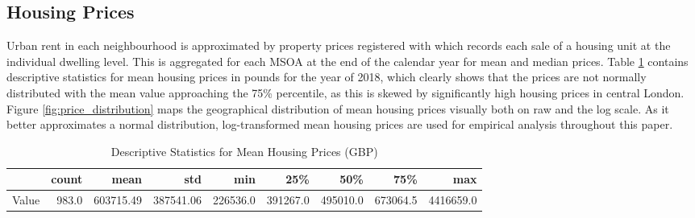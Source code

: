 \documentclass{article}
\begin{document}
\subsection{Housing Prices}
Urban rent in each neighbourhood is approximated by property prices registered with \citet{LandRegistry2019AverageLSOA} which records each sale of a housing unit at the individual dwelling level. This is aggregated for each MSOA at the end of the calendar year for mean and median prices. Table \ref{table:housing} contains descriptive statistics for mean housing prices in pounds for the year of 2018, which clearly shows that the prices are not normally distributed with the mean value approaching the 75\% percentile, as this is skewed by significantly high housing prices in central London. Figure \ref{fig:price_distribution} maps the geographical distribution of mean housing prices visually both on raw and the log scale. As it better approximates a normal distribution, log-transformed mean housing prices are used for empirical analysis throughout this paper.

\begin{table}[t]
\caption{Descriptive Statistics for Mean Housing Prices (GBP)} 
  \label{table:housing} 
\begin{tabular}{lrrrrrrrr}
\toprule
{} &  count &       mean &        std &       min &       25\% &       50\% &       75\% &        max \\
\midrule
Value &  983.0 &  603715.49 &  387541.06 &  226536.0 &  391267.0 &  495010.0 &  673064.5 &  4416659.0 \\
\bottomrule
\end{tabular}
\end{table}
\end{document}
